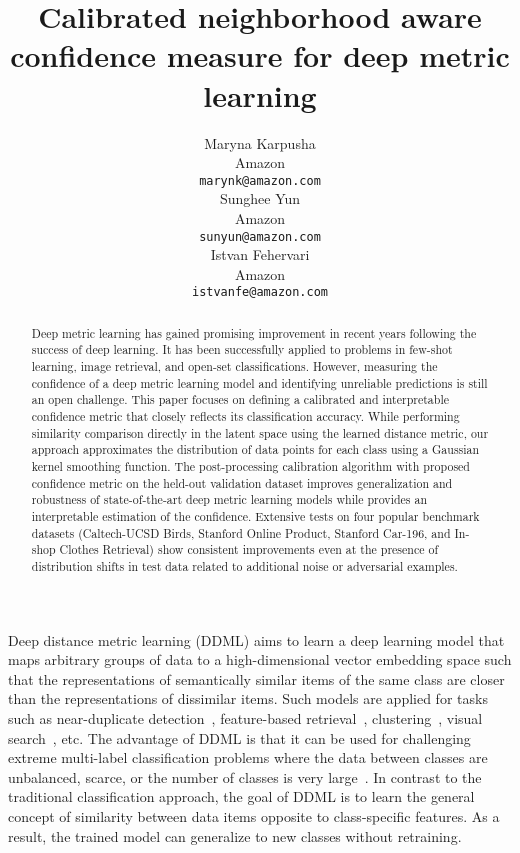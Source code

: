 \documentclass{article}
\title{Calibrated neighborhood aware confidence measure for deep metric learning}
\author{Maryna Karpusha \\
  Amazon\\
  \texttt{marynk@amazon.com} \\
\And
  Sunghee Yun \\
  Amazon\\
  \texttt{sunyun@amazon.com} \\
    \And
  Istvan Fehervari \\
  Amazon\\
  \texttt{istvanfe@amazon.com} \\
}
\begin{document}
\maketitle

\begin{abstract}
Deep metric learning has gained promising improvement in recent years following the success of deep learning. It has been successfully applied to problems in few-shot learning, image retrieval, and open-set classifications. However, measuring the confidence of a deep metric learning model and identifying unreliable predictions is still an open challenge. This paper focuses on defining a calibrated and interpretable confidence metric that closely reflects its classification accuracy. While performing similarity comparison directly in the latent space using the learned distance metric, our approach approximates the distribution of data points for each class using a Gaussian kernel smoothing function. The post-processing calibration algorithm with proposed confidence metric on the held-out validation dataset improves generalization and robustness of  state-of-the-art deep metric learning models while provides an interpretable estimation of the confidence. Extensive tests on four popular benchmark datasets (Caltech-UCSD Birds,  Stanford Online Product, Stanford Car-196, and In-shop Clothes Retrieval) show consistent improvements even at the presence of distribution shifts in test data related to additional noise or adversarial examples.

\end{abstract}
Deep distance metric learning (DDML) aims to learn a deep learning model that maps arbitrary groups of data to a high-dimensional vector embedding space such that the representations of semantically similar items of the same class are closer than the representations of dissimilar items. Such models are applied for tasks such as near-duplicate detection~\cite{b6}, feature-based retrieval~\cite{b1, b2, b3, b4}, clustering~\cite{b5}, visual search~\cite{b7, b8}, etc. The advantage of DDML is that it can be used for challenging extreme multi-label classification problems where the data between classes are unbalanced, scarce, or the number of classes is very large~\cite{b9, b10, b22, extreme_softmax}. In contrast to the traditional classification approach, the goal of DDML is to learn the general concept of similarity between data items opposite to class-specific features. As a result, the trained model can generalize to new classes without retraining.
\end{document}
